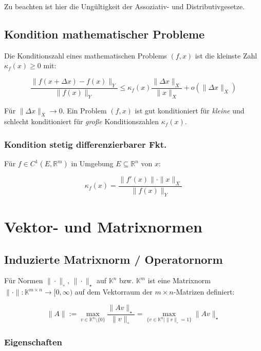 Zu beachten ist hier die Ungültigkeit der Assoziativ- und Distributivgesetze.

\subsection*{Kondition mathematischer Probleme}

Die Konditionszahl eines mathematischen Problems $(f, x)$ ist die kleinste Zahl $\kappa_f(x) \geq 0$ mit:

\vspace*{-4mm}
$$\frac{\|f(x + \Delta x) - f(x) \|_Y}{\|f(x)\|_Y} \leq \kappa_f(x) \frac{\|\Delta x\|_X}{\|x\|_X} + o(\|\Delta x \|_X)$$

Für $\|\Delta x\|_X \rightarrow 0$. Ein Problem $(f, x)$ ist gut konditioniert für \emph{kleine} und schlecht konditioniert für \emph{große} Konditionszahlen $\kappa_f(x)$.

\subsubsection*{Kondition stetig differenzierbarer Fkt.}

Für $f \in C^1(E, \mathbb{R}^m)$ in Umgebung $E \subseteq \mathbb{R}^n$ von $x$:

\vspace*{-2mm}
$$\kappa_f(x) = \frac{\|f'(x)\| \cdot \|x\|_X}{\|f(x)\|_Y}$$

\section*{Vektor- und Matrixnormen}

\subsection*{Induzierte Matrixnorm / Operatornorm}

Für Normen $\| \cdot \|_\circ$, $\| \cdot \|_\star$ auf $\mathbb{K}^n$ bzw. $\mathbb{K}^m$ ist eine Matrixnorm $\| \cdot \| : \mathbb{K}^{m \times n} \rightarrow [0,\infty)$ auf dem Vektorraum der $m \times n$-Matrizen definiert:

\vspace*{-4mm}
$$\|A\| := \max_{v \in \mathbb{K}^n \setminus \{0\}} \frac{\|Av\|_\star}{\|v\|_\circ} = \max_{\{v \in \mathbb{K}^n | \|v\|_\circ = 1 \}} \|Av\|_\star$$

\subsubsection*{Eigenschaften}

